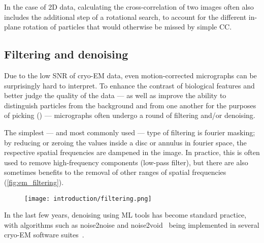 In the case of 2D data, calculating the cross-correlation of two images often also includes the additional step of a rotational search, to account for the different in-plane rotation of particles that would otherwise be missed by simple CC.

\subsection{Filtering and denoising}\label{em_filtering_and_denoising}

Due to the low SNR of cryo-EM data, even motion-corrected micrographs can be surprisingly hard to interpret.
To enhance the contrast of biological features and better judge the quality of the data --- as well as improve the ability to distinguish particles from the background and from one another for the purposes of picking () --- micrographs often undergo a round of filtering and/or denoising.

The simplest --- and most commonly used --- type of filtering is fourier masking; by reducing or zeroing the values inside a disc or annulus in fourier space, the respective spatial frequencies are dampened in the image.
In practice, this is often used to remove high-frequency components (low-pass filter), but there are also sometimes benefits to the removal of other ranges of spatial frequencies (\autoref{fig:em_filtering}).

\begin{figure}[ht]
    \centering
    \texttt{[image: introduction/filtering.png]}
    \label{fig:em_filtering}
\end{figure}

In the last few years, denoising using ML tools has become standard practice, with algorithms such as noise2noise and noise2void~\cite{lehtinenNoise2NoiseLearningImage2018,krullNoise2VoidLearningDenoising2019} being implemented in several cryo-EM software suites~\cite{beplerTopazDenoiseGeneralDeep2020,tegunovRealtimeCryoelectronMicroscopy2019,buchholzCryoCAREContentAwareImage2018}.

